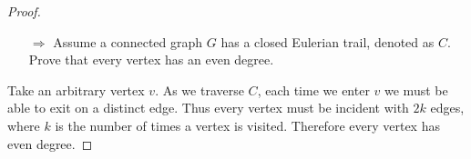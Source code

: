\documentclass{beamer}
\begin{document}
\begin{frame}[t]
	\begin{proof}\renewcommand{\qedsymbol}{}
		\begin{enumerate}
			\item[$\Rightarrow$]
			Assume a connected graph $G$ has a closed Eulerian trail, denoted as $C$. Prove that every
			vertex has an even degree.
		\end{enumerate}
		Take an arbitrary vertex $v$. As we traverse $C$, each time we enter $v$ we must be able
		to exit on a distinct edge. Thus every vertex must be incident with $2k$ edges, where $k$
		is the number of times a vertex is visited. Therefore every vertex has even degree.

	\end{proof}

	\begin{figure}
		\centering
	\end{figure}
\end{frame}
\end{document}
